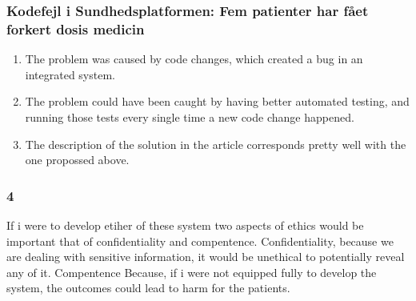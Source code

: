 \documentclass{article}
\begin{document}
\subsubsection*{Kodefejl i Sundhedsplatformen: Fem patienter har fået forkert dosis medicin}
\begin{enumerate}
    \item The problem was caused by code changes, which created a bug in an integrated system. 
    \item The problem could have been caught by having better automated testing, and running those tests every single time a new code change happened.
    \item The description of the solution in the article corresponds pretty well with the one propossed above.
\end{enumerate}
\subsubsection*{\textbf{4}}If i were to develop etiher of these system two aspects of ethics would be important that of confidentiality and compentence. Confidentiality, because we are dealing with sensitive information, it would be unethical to potentially reveal any of it. Compentence Because, if i were not equipped fully to develop the system, the outcomes could lead to harm for the patients.  
\end{document}
